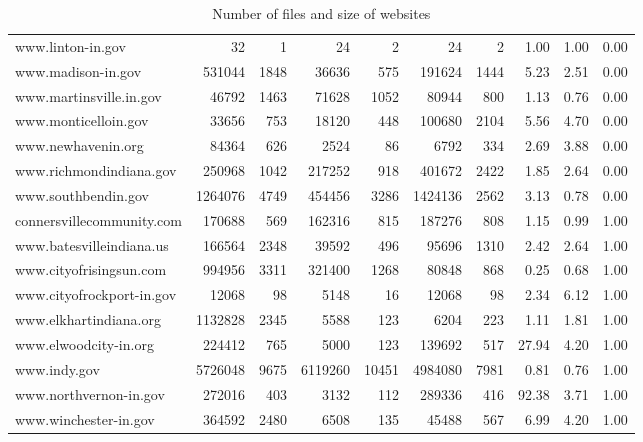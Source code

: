 \documentclass[11pt]{article}
\begin{document}
\begin{landscape}
\begin{table}[ht]
\begin{tabular}{lrrrrrrrrr}
		www.linton-in.gov &  32 &   1 &  24 &   2 &  24 &   2 & 1.00 & 1.00 & 0.00 \\ 
		www.madison-in.gov & 531044 & 1848 & 36636 & 575 & 191624 & 1444 & 5.23 & 2.51 & 0.00 \\ 
		www.martinsville.in.gov & 46792 & 1463 & 71628 & 1052 & 80944 & 800 & 1.13 & 0.76 & 0.00 \\ 
		www.monticelloin.gov & 33656 & 753 & 18120 & 448 & 100680 & 2104 & 5.56 & 4.70 & 0.00 \\ 
		www.newhavenin.org & 84364 & 626 & 2524 &  86 & 6792 & 334 & 2.69 & 3.88 & 0.00 \\ 
		www.richmondindiana.gov & 250968 & 1042 & 217252 & 918 & 401672 & 2422 & 1.85 & 2.64 & 0.00 \\ 
		www.southbendin.gov & 1264076 & 4749 & 454456 & 3286 & 1424136 & 2562 & 3.13 & 0.78 & 0.00 \\ 
		connersvillecommunity.com & 170688 & 569 & 162316 & 815 & 187276 & 808 & 1.15 & 0.99 & 1.00 \\ 
		www.batesvilleindiana.us & 166564 & 2348 & 39592 & 496 & 95696 & 1310 & 2.42 & 2.64 & 1.00 \\ 
		www.cityofrisingsun.com & 994956 & 3311 & 321400 & 1268 & 80848 & 868 & 0.25 & 0.68 & 1.00 \\ 
		www.cityofrockport-in.gov & 12068 &  98 & 5148 &  16 & 12068 &  98 & 2.34 & 6.12 & 1.00 \\ 
		www.elkhartindiana.org & 1132828 & 2345 & 5588 & 123 & 6204 & 223 & 1.11 & 1.81 & 1.00 \\ 
		www.elwoodcity-in.org & 224412 & 765 & 5000 & 123 & 139692 & 517 & 27.94 & 4.20 & 1.00 \\ 
		www.indy.gov & 5726048 & 9675 & 6119260 & 10451 & 4984080 & 7981 & 0.81 & 0.76 & 1.00 \\ 
		www.northvernon-in.gov & 272016 & 403 & 3132 & 112 & 289336 & 416 & 92.38 & 3.71 & 1.00 \\ 
		www.winchester-in.gov & 364592 & 2480 & 6508 & 135 & 45488 & 567 & 6.99 & 4.20 & 1.00 \\ 
		\hline
	\end{tabular}
	\caption{Number of files and size of websites} 
\end{table}
\end{landscape}
\end{document}
